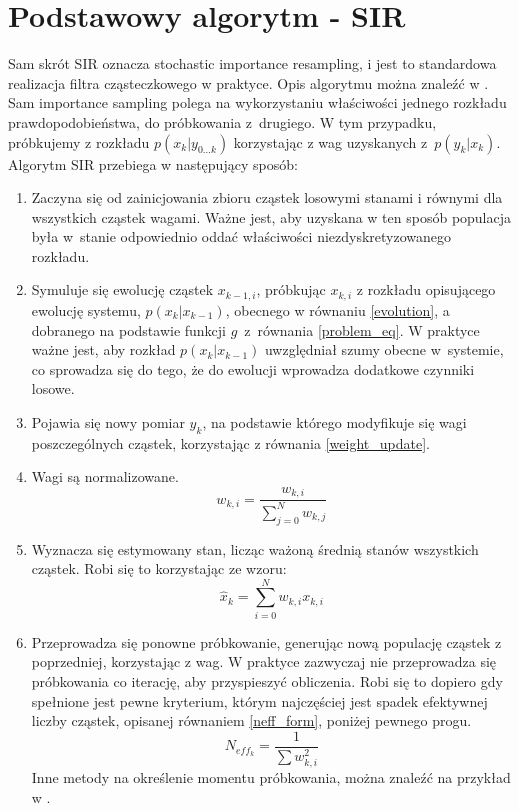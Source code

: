 \section{Podstawowy algorytm - SIR} \label{basic_algorithm}
Sam skrót SIR oznacza stochastic importance resampling, i jest to standardowa realizacja filtra cząsteczkowego w praktyce. Opis algorytmu można znaleźć w \cite{wiki_pf}. Sam importance sampling polega na wykorzystaniu właściwości jednego rozkładu prawdopodobieństwa, do próbkowania z~drugiego. W tym przypadku, próbkujemy z rozkładu $p(x_k|y_{0...k})$ korzystając z wag uzyskanych z~$p(y_k|x_k)$.
Algorytm SIR przebiega w następujący sposób:
\begin{enumerate}[label=(\alph*)]
	\item Zaczyna się od zainicjowania zbioru cząstek losowymi stanami i równymi dla wszystkich cząstek wagami. Ważne jest, aby uzyskana w ten sposób populacja była w~stanie odpowiednio oddać właściwości niezdyskretyzowanego rozkładu. \label{pf_init_step}
	
	\item Symuluje się ewolucję cząstek $x_{k-1,i}$, próbkując $x_{k,i}$ z rozkładu opisującego ewolucję systemu, $p(x_k|x_{k-1})$, obecnego w równaniu \ref{evolution}, a dobranego na podstawie funkcji $g$~z~równania \ref{problem_eq}. W praktyce ważne jest, aby rozkład $p(x_k|x_{k-1})$ uwzględniał szumy obecne w~systemie, co sprowadza się do tego, że do ewolucji wprowadza dodatkowe czynniki losowe. \label{pf_drift_step}
	
	\item Pojawia się nowy pomiar $y_k$, na podstawie którego modyfikuje się wagi poszczególnych cząstek, korzystając z równania \ref{weight_update}. \label{pf_reweight_step}

	\item Wagi są normalizowane. \label{pf_weight_normalization_step}
	\begin{equation}
		w_{k,i}=\frac{w_{k,i}}{\sum_{j=0}^{N} w_{k,j}}
	\end{equation}

	\item Wyznacza się estymowany stan, licząc ważoną średnią stanów wszystkich cząstek. Robi się to korzystając ze wzoru: \label{pf_est_step}
	\begin{equation}
		\hat{x}_k = \sum_{i=0}^{N} w_{k,i} x_{k,i}
	\end{equation}
	\item Przeprowadza się ponowne próbkowanie, generując nową populację cząstek z poprzedniej, korzystając z wag. W praktyce zazwyczaj nie przeprowadza się próbkowania co iterację, aby przyspieszyć obliczenia. Robi się to dopiero gdy spełnione jest pewne kryterium, którym najczęściej jest spadek efektywnej liczby cząstek, opisanej równaniem \ref{neff_form}, poniżej pewnego progu.
	\begin{equation}\label{neff_form}
		N_{eff_k} = \dfrac{1}{\sum w_{k,i}^2}
	\end{equation}
	Inne metody na określenie momentu próbkowania, można znaleźć na przykład w \cite{adaptive_resampling}.\label{resampling_step}
\end{enumerate}
